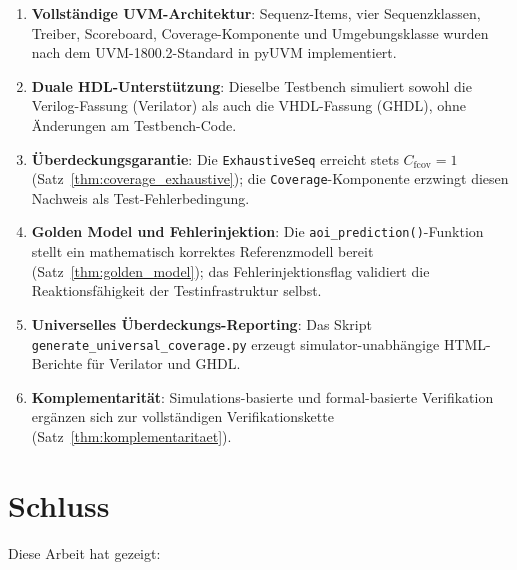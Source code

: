 ﻿\documentclass[12pt,a4paper]{report}
\begin{document}
\begin{enumerate}
    \item \textbf{Vollständige UVM-Architektur}: Sequenz-Items, vier Sequenzklassen,
          Treiber, Scoreboard, Coverage-Komponente und Umgebungsklasse wurden
          nach dem UVM-1800.2-Standard in pyUVM implementiert.
    \item \textbf{Duale HDL-Unterstützung}: Dieselbe Testbench simuliert sowohl
          die Verilog-Fassung (Verilator) als auch die VHDL-Fassung (GHDL),
          ohne Änderungen am Testbench-Code.
    \item \textbf{Überdeckungsgarantie}: Die \texttt{ExhaustiveSeq} erreicht
          stets $C_{\mathrm{fcov}} = 1$ (Satz~\ref{thm:coverage_exhaustive});
          die \texttt{Coverage}-Komponente erzwingt diesen Nachweis als
          Test-Fehlerbedingung.
    \item \textbf{Golden Model und Fehlerinjektion}: Die
          \texttt{aoi\_prediction()}-Funktion stellt ein mathematisch korrektes
          Referenzmodell bereit (Satz~\ref{thm:golden_model}); das
          Fehlerinjektionsflag validiert die Reaktionsfähigkeit der
          Testinfrastruktur selbst.
    \item \textbf{Universelles Überdeckungs-Reporting}: Das Skript
          \texttt{generate\_universal\_cover\newline age.py} erzeugt simulator-unabhängige
          HTML-Berichte für Verilator und GHDL.
    \item \textbf{Komplementarität}: Simulations-basierte und formal-basierte
          Verifikation ergänzen sich zur vollständigen Verifikationskette
          (Satz~\ref{thm:komplementaritaet}).
\end{enumerate}

\chapter{Schluss}

Diese Arbeit hat gezeigt:
\end{document}
